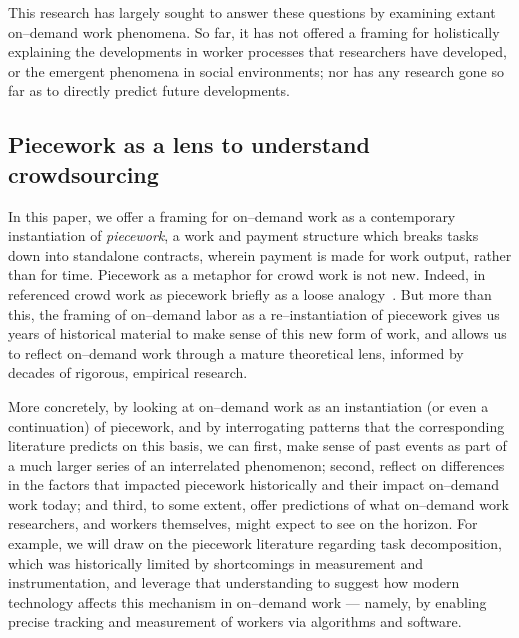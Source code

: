 \documentclass[trackingWork]{subfiles}
\begin{document}
This research has largely sought to answer these questions by examining extant on--demand work phenomena.
So far, it has not offered a framing for holistically explaining
the developments in worker processes that researchers have developed, or
the emergent phenomena in social environments;
nor has any research
gone so far as to directly predict future developments.

\subsection{Piecework as a lens to understand crowdsourcing}
In this paper, we offer a framing for on--demand work as a contemporary instantiation of \textit{piecework},
a work and payment structure which breaks tasks down into standalone contracts,
wherein payment is made for work output, rather than for time.
Piecework as a metaphor for crowd work is not new.
Indeed,
\citeauthor{crowdworkFuture} in \citeyear{crowdworkFuture}
referenced crowd work as piecework briefly
as a loose analogy~\cite{crowdworkFuture}.
But more than this,
the framing of on--demand labor as a re--instantiation of piecework
gives us years of historical material to make sense of this new form of work, and allows us to reflect on--demand work through a mature theoretical lens, informed by decades of rigorous, empirical research.

More concretely, by looking at on--demand work as
an instantiation (or even a continuation) of piecework,
and by interrogating patterns that the corresponding literature predicts
on this basis, we can
first, make sense of past events as part of a much larger series of an interrelated phenomenon;
second, reflect on differences in the factors that impacted piecework historically and their impact on--demand work today;
and third, to some extent, offer predictions of what on--demand work researchers,
and workers themselves,
might expect to see on the horizon.
For example, we will draw on the piecework literature regarding task decomposition,
which was historically limited by shortcomings in measurement and instrumentation, and
leverage that understanding to suggest how modern technology affects this mechanism in on--demand work
--- namely, by enabling precise tracking and measurement of workers via algorithms and software.
\end{document}
